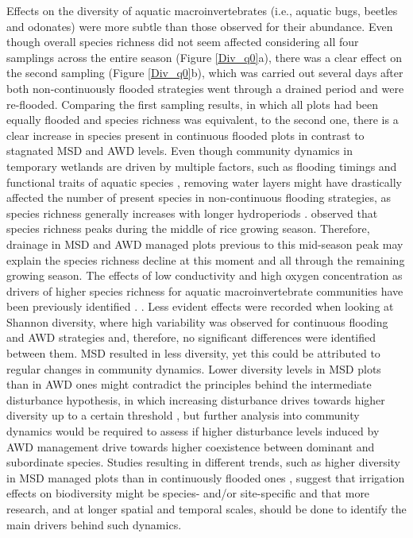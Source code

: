 Effects on the diversity of aquatic macroinvertebrates (i.e., aquatic bugs, beetles and odonates) were more subtle than those observed for their abundance. Even though overall species richness did not seem affected considering all four samplings across the entire season (Figure \ref{Div_q0}a), there was a clear effect on the second sampling (Figure \ref{Div_q0}b), which was carried out several days after both non-continuously flooded strategies went through a drained period and were re-flooded. Comparing the first sampling results, in which all plots had been equally flooded and species richness was equivalent, to the second one, there is a clear increase in species present in continuous flooded plots in contrast to stagnated MSD and AWD levels. Even though community dynamics in temporary wetlands are driven by multiple factors, such as flooding timings and functional traits of aquatic species \citep{schneider1996, boix2016}, removing water layers might have drastically affected the number of present species in non-continuous flooding strategies, as species richness generally increases with longer hydroperiods \citep{batzer1996}. \cite{perez2023enhanced} observed that species richness peaks during the middle of rice growing season. Therefore, drainage in MSD and AWD managed plots previous to this mid-season peak may explain the species richness decline at this moment and all through the remaining growing season. The effects of low conductivity and high oxygen concentration as drivers of higher species richness for aquatic macroinvertebrate communities have been previously identified \citep{graca2004, waterkeyn2008, boix2010, brucetbalmana2012, croijmans2021, mazzoni2023}. . Less evident effects were recorded when looking at Shannon diversity, where high variability was observed for continuous flooding and AWD strategies and, therefore, no significant differences were identified between them. MSD resulted in less diversity, yet this could be attributed to regular changes in community dynamics. Lower diversity levels in MSD plots than in AWD ones might contradict the principles behind the intermediate disturbance hypothesis, in which increasing disturbance drives towards higher diversity up to a certain threshold \citep{dial1998}, but further analysis into community dynamics would be required to assess if higher disturbance levels induced by AWD management drive towards higher coexistence between dominant and subordinate species. Studies resulting in different trends, such as higher diversity in MSD managed plots than in continuously flooded ones \citep{watanabe2013}, suggest that irrigation effects on biodiversity might be species- and/or site-specific and that more research, and at longer spatial and temporal scales, should be done to identify the main drivers behind such dynamics.\\

